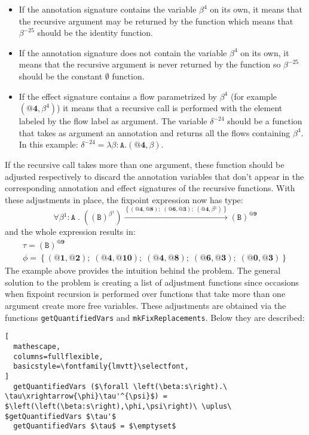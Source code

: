 \documentclass[8pt]{extarticle}
\begin{document}
\begin{itemize}
\item If the annotation signature contains the variable $\beta^{4}$ on its own, it means that the recursive argument may be returned by the function which means that $\beta^{-25}$ should be the identity function.
\item If the annotation signature does not contain the variable $\beta^{4}$ on its own, it means that the recursive argument is never returned by the function so $\beta^{-25}$ should be the constant $\emptyset$ function.
\item If the effect signature contains a flow parametrized by $\beta^{4}$ (for example $\left(\mathbf{@4},\beta^{4}\right)$) it means that a recursive call is performed with the element labeled by the flow label as argument. The variable $\delta^{-24}$ should be a function that takes as argument an annotation and returns all the flows containing $\beta^4$. In this example: $\delta^{-24}=\lambda\beta:\mathtt{A}.\left(\mathbf{@4},\beta\right)$.
\end{itemize}
If the recursive call takes more than one argument, these function should be adjusted respectively to discard the annotation variables that don't appear in the corresponding annotation and effect signatures of the recursive functions. With these adjustments in place, the fixpoint expression now has type:
\[
\forall{}\beta{}^{1}:\mathtt{A}\;{}.\;{}\left(\left(\mathtt{B}\right)^{\beta{}^{1}}\right)\xrightarrow{\left\{\left(\textbf{@4},\textbf{@8}\right);\;{}\left(\textbf{@6},\textbf{@3}\right);\;{}\left(\textbf{@4},\beta{}^{1}\right)\right\}}\left(\mathtt{B}\right)^{\textbf{@9}}
\]
and the whole expression results in:
\[
\begin{array}{c}
\tau=\left(\mathtt{B}\right)^{\textbf{@9}} \\
\phi=\left\{\left(\textbf{@1},\textbf{@2}\right);\;{}\left(\textbf{@4},\textbf{@10}\right);\;{}\left(\textbf{@4},\textbf{@8}\right);\;{}\left(\textbf{@6},\textbf{@3}\right);\;{}\left(\textbf{@0},\textbf{@3}\right)\right\}
\end{array}
\]
The example above provides the intuition behind the problem. The general solution to the problem is creating a list of adjustment functions since occasions when fixpoint recursion is performed over functions that take more than one argument create more free variables. These adjustments are obtained via the functions \verb+getQuantifiedVars+ and \verb+mkFixReplacements+. Below they are described:
\begin{lstlisting}[
  mathescape,
  columns=fullflexible,
  basicstyle=\fontfamily{lmvtt}\selectfont,
]
  getQuantifiedVars ($\forall \left(\beta:s\right).\ \tau\xrightarrow{\phi}\tau'^{\psi}$) = $\left(\left(\beta:s\right),\phi,\psi\right)\ \uplus\ $getQuantifiedVars $\tau'$
  getQuantifiedVars $\tau$ = $\emptyset$
\end{lstlisting}
\end{document}
